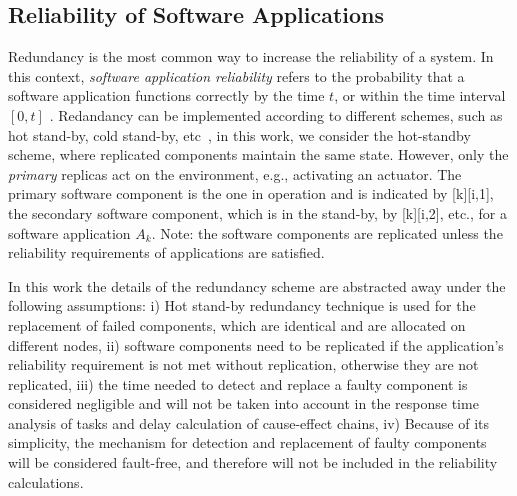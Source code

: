 {%

\subsection{Reliability of Software Applications}\label{sub_reliability}
Redundancy is the most common way to increase the reliability of a system. In this context, \textit{software application reliability} refers to the probability that a software application functions correctly by the time $t$, or within the time interval $[0, t]$ \cite{Goel1985SoftwareApplicability}. Redandancy can be implemented according to different schemes, such as hot stand-by, cold stand-by, etc~\cite{Dubrova2013Fault-tolerantDesign}, in this work, we consider the hot-standby scheme, where replicated components maintain the same state. However, only the \textit{primary} replicas act on the environment, e.g., activating an actuator. The primary software component is the one in operation and is indicated by [k][i,1], the secondary software component, which is in the stand-by, by [k][i,2], etc., for a software application $A_k$.  Note: the software components are replicated unless the reliability requirements of applications are satisfied.

In this work the details of the redundancy scheme are abstracted away under the following assumptions: i) Hot stand-by redundancy technique is used for the replacement of failed components, which are identical and are allocated on different nodes, ii) software components need to be replicated if the application's reliability requirement is not met without replication, otherwise they are not replicated, iii) the time needed to detect and replace a faulty component is considered negligible and will not be taken into account in the response time analysis of tasks and delay calculation of cause-effect chains, iv) Because of its simplicity, the mechanism for detection and replacement of faulty components will be considered fault-free, and therefore will not be included in the reliability calculations.

}
